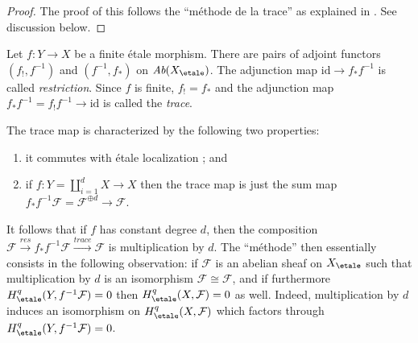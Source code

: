\begin{proof}
The proof of this follows the
``m\'ethode de la trace''
as explained in \cite[Expos\'e IX, \S5]{SGA4}.
See discussion below.
\end{proof}

\begin{definition}
\label{definition-trace-map}
Let $f : Y \to X$ be a finite \'etale morphism. There are pairs of adjoint
functors $(f_!, f^{-1})$ and $(f^{-1}, f_*)$ on
$\textit{Ab}(X_\etale)$. The
adjunction map $\text{id} \to f_* f^{-1}$ is called {\it restriction}. Since
$f$ is finite, $f_! = f_*$ and the adjunction map $f_* f^{-1} = f_! f^{-1} \to
\text{id}$ is called the {\it trace}.
\end{definition}

\noindent
The trace map is characterized by the following two properties:
\begin{enumerate}
\item
it commutes with \'etale localization ; and
\item
if $f: Y = \coprod_{i=1}^d X \to X$ then the trace map is just the sum map
$f_*f^{-1} \mathcal{F} = \mathcal{F}^{\oplus d} \to \mathcal{F}$.
\end{enumerate}
It follows that if $f$ has constant degree $d$, then the composition
$\mathcal{F} \xrightarrow{res} f_* f^{-1} \mathcal{F} \xrightarrow{trace}
\mathcal{F}$ is multiplication by $d$. The ``m\'ethode'' then essentially
consists in the following observation: if $\mathcal{F}$ is an abelian sheaf on
$X_\etale$ such that multiplication by $d$ is an isomorphism
$\mathcal{F} \cong \mathcal{F}$, and if furthermore
$H_\etale^q(Y, f^{-1}\mathcal{F}) = 0$ then
$H_\etale^q(X, \mathcal{F}) = 0$ as well.
Indeed, multiplication by $d$ induces an
isomorphism on $H_\etale^q(X, \mathcal{F})$ which factors through
$H_\etale^q(Y, f^{-1}\mathcal{F})= 0$.

